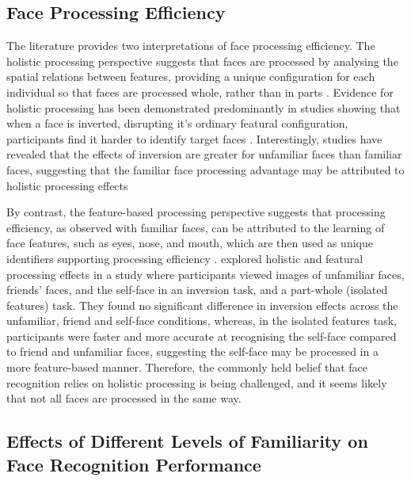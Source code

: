 \documentclass[
  10pt,
  letterpaper,
]{article}
\begin{document}
\subsection{Face Processing
Efficiency}\label{face-processing-efficiency}

The literature provides two interpretations of face processing
efficiency. The holistic processing perspective suggests that faces are
processed by analysing the spatial relations between features, providing
a unique configuration for each individual so that faces are processed
whole, rather than in parts \citep{sandford2014a}. Evidence for holistic
processing has been demonstrated predominantly in studies showing that
when a face is inverted, disrupting it's ordinary featural
configuration, participants find it harder to identify target faces
\citep{taubert2011a, tong1999a}. Interestingly, studies have revealed
that the effects of inversion are greater for unfamiliar faces than
familiar faces, suggesting that the familiar face processing advantage
may be attributed to holistic processing effects \citep[
]{ramon2016a, oleggio2017a}

By contrast, the feature-based processing perspective suggests that
processing efficiency, as observed with familiar faces, can be
attributed to the learning of face features, such as eyes, nose, and
mouth, which are then used as unique identifiers supporting processing
efficiency \citep{abudarham2016a}. \citet{lee2022a} explored holistic
and featural processing effects in a study where participants viewed
images of unfamiliar faces, friends' faces, and the self-face in an
inversion task, and a part-whole (isolated features) task. They found no
significant difference in inversion effects across the unfamiliar,
friend and self-face conditions, whereas, in the isolated features task,
participants were faster and more accurate at recognising the self-face
compared to friend and unfamiliar faces, suggesting the self-face may be
processed in a more feature-based manner. Therefore, the commonly held
belief that face recognition relies on holistic processing is being
challenged, and it seems likely that not all faces are processed in the
same way.

\subsection{Effects of Different Levels of Familiarity on Face
Recognition
Performance}\label{effects-of-different-levels-of-familiarity-on-face-recognition-performance}
\end{document}
